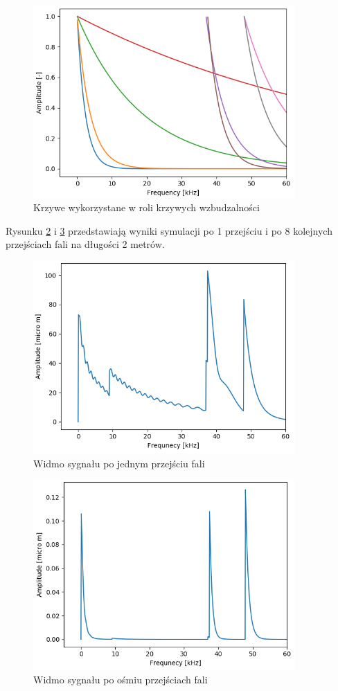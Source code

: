 \begin{figure}[h]
\centering
\includegraphics[width=10cm]{Zdjecia/5/krzywe_wzbudzalnosci}
\caption{Krzywe wykorzystane w roli krzywych wzbudzalności}
\label{fig:singExc}
\end{figure}

Rysunku \ref{fig:1prop} i \ref{fig:8prop} przedstawiają wyniki symulacji po 1 przejściu i po 8 kolejnych przejściach fali na długości 2 metrów.

\begin{figure}[h]
\centering
\includegraphics[width=10cm]{Zdjecia/5/1}
\caption{Widmo sygnału po jednym przejściu fali}
\label{fig:1prop}
\end{figure}

\begin{figure}[h]
\centering
\includegraphics[width=10cm]{Zdjecia/5/8}
\caption{Widmo sygnału po ośmiu przejściach fali}
\label{fig:8prop}
\end{figure}

